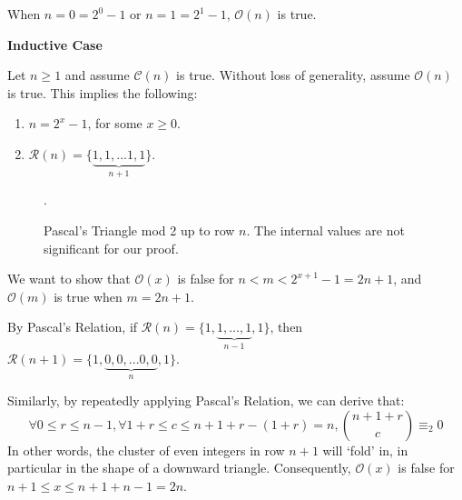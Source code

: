 \documentclass{article}
\newcommand{\pred}{\mathcal{O}}
\newcommand{\conject}{\mathcal{C}}
\newcommand{\modrow}{\mathcal{R}}
\newcommand{\drawemptyrow}[4]{
    \node at (#2/4, #3/4) {#4};
    \node at (#2/-4, #3/4) {#4};
  }
\newcommand{\drawrow}[4]{
  \drawemptyrow{#1}{#2}{#3}{#4}
  \foreach \i in {0,...,#1}{
    \node at (#2/-4-\i/-2,#3/4){#4};
  }
}
\newcommand{\drawoddtriangle}[2]{
  \foreach \i in {0,...,7}{
    \drawemptyrow{\i}{#1+0+\i}{#2+7-\i}{1}
   }
   \drawrow{7}{#1+7}{#2+21}{1}
  }
\begin{document}
When $n = 0 = 2^0-1$ or $n=1=2^1-1$, $\pred(n)$ is true.

\begin{center}\item\textbf{Inductive Case} \end{center}

Let $n\geq 1$ and assume $\conject(n)$ is true. Without loss of generality, assume $\pred(n)$ is true. This implies the following:
\begin{enumerate}
  \item $n = 2^x - 1$, for some $x \geq 0$.
  \item $\modrow(n) = \{\underbrace{1,1,...1,1}_{n+1}\}$.
\end{enumerate}

\begin{figure}[H]
\centering
{}
\caption {Pascal's Triangle mod 2 up to row $n$. The internal values are not significant for our proof.}.
\end{figure}

We want to show that $\pred(x)$ is false for $n < m < 2^{x+1}-1 = 2n+1$, and $\pred(m)$ is true when $m = 2n+1$.

By Pascal's Relation, if $\modrow(n) = \{1,\underbrace{1,...,1}_{n-1},1\}$, 
then $\modrow(n+1) = \{1,\underbrace{0,0,...0,0}_{n},1\}$.

\begin{figure}[H]
\centering
{}
\end{figure}

Similarly, by repeatedly applying Pascal's Relation, we can derive that:
$$
\forall 0 \leq r \leq n-1, \forall 1+r\leq c \leq n+1+r-(1+r)=n, {n+1+r \choose c} \equiv_2 0
$$
In other words, the cluster of even integers in row $n+1$ will `fold' in, in particular in the shape of a downward triangle. Consequently, $\pred(x)$ is false for $n+1\leq x \leq n+1+n-1 = 2n$.

\begin{figure}[H]
\centering
{}
\end{figure}
\end{document}

